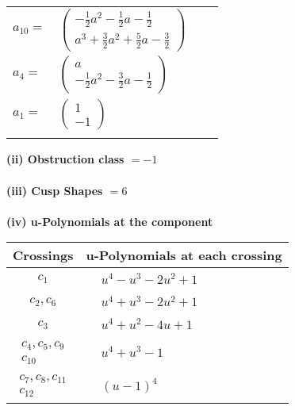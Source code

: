 \documentclass[1p]{elsarticle_modified}
\theoremstyle{definition}
\begin{document}
\begin{tabular}{m{7pt} m{180pt} m{7pt} m{180pt} }
\flushright $a_{10}=$&$\begin{pmatrix}-\frac{1}{2} a^2-\frac{1}{2} a-\frac{1}{2}\\a^3+\frac{3}{2} a^2+\frac{5}{2} a-\frac{3}{2}\end{pmatrix}$ \\
\flushright $a_{4}=$&$\begin{pmatrix}a\\-\frac{1}{2} a^2-\frac{3}{2} a-\frac{1}{2}\end{pmatrix}$ \\
\flushright $a_{1}=$&$\begin{pmatrix}1\\-1\end{pmatrix}$\\&\end{tabular}
\flushleft \textbf{(ii) Obstruction class $= -1$}\\~\\
\flushleft \textbf{(iii) Cusp Shapes $= 6$}\\~\\
\newpage\renewcommand{\arraystretch}{1}
\flushleft \textbf{(iv) u-Polynomials at the component}\newline \\
\begin{tabular}{m{50pt}|m{274pt}}
Crossings & \hspace{64pt}u-Polynomials at each crossing \\
\hline $$\begin{aligned}c_{1}\end{aligned}$$&$\begin{aligned}
&u^4- u^3-2 u^2+1
\end{aligned}$\\
\hline $$\begin{aligned}c_{2},c_{6}\end{aligned}$$&$\begin{aligned}
&u^4+u^3-2 u^2+1
\end{aligned}$\\
\hline $$\begin{aligned}c_{3}\end{aligned}$$&$\begin{aligned}
&u^4+u^2-4 u+1
\end{aligned}$\\
\hline $$\begin{aligned}c_{4},c_{5},c_{9}\\c_{10}\end{aligned}$$&$\begin{aligned}
&u^4+u^3-1
\end{aligned}$\\
\hline $$\begin{aligned}c_{7},c_{8},c_{11}\\c_{12}\end{aligned}$$&$\begin{aligned}
&(u-1)^4
\end{aligned}$\\
\hline
\end{tabular}\\~\\
\end{document}
